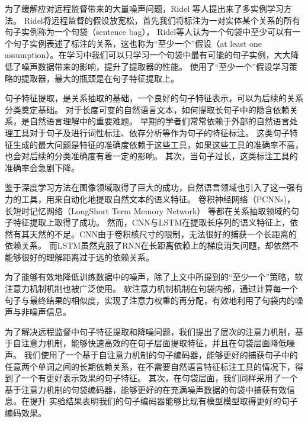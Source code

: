 \documentclass[UTF8]{csoarticle}
\begin{document}
为了缓解应对远程监督带来的大量噪声问题，Ridel\cite{bib1} 等人提出来了多实例学习方法。
Ridel将远程监督的假设放宽松，首先我们将标注为一对实体某个关系的所有句子实例称为一个句袋（sentence bag），
Ridel等人认为一个句袋中至少可以有一个句子实例表述了标注的关系，这也称为“至少一个”假设（at least one assumption）。在学习中我们可以只学习一个句袋中最有可能的句子实例，大大降低了噪声数据带来的影响，提升了提取器的性能。
使用了“至少一个”假设学习策略的提取器，最大的瓶颈是在句子特征提取上。

句子特征提取，是关系抽取的基础，一个良好的句子特征表示，可以为后续的关系分类奠定基础。
对于长度可变的自然语言文本，如何提取长句子中的隐含依赖关系，是自然语言理解中的重要难题。
早期的学者们常常依赖于外部的自然语言处理工具对于句子及进行词性标注、依存分析等作为句子的特征标注。
这类句子特征生成的最大问题是特征的准确度依赖于这些工具，如果这些工具的准确率不高，也会对后续的分类准确度有着一定的影响。
其次，当句子过长，这类标注工具的准确率会急剧下降。

鉴于深度学习方法在图像领域取得了巨大的成功，自然语言领域也引入了这一强有力的工具，用来自动化地提取自然文本的语义特征。
卷积神经网络（PCNNs)\cite{bib11}，长短时记忆网络（LongShort Term Memory Network）\cite{bib10} 等都在关系抽取领域的句子特征提取上取得了成功。
然而，CNN与LSTM在提取长序列的语义特征上，依然有其天然的不足。CNN由于卷积核尺寸的限制，无法很好的捕获一个长距离的依赖关系。
而LSTM虽然克服了RNN在长距离依赖上的梯度消失问题，却依然不能够很好的理解距离过于远的依赖关系。

为了能够有效地降低训练数据中的噪声，除了上文中所提到的“至少一个”策略，软注意力机制机制也被广泛使用。
软注意力机制机制在句袋内部，通过计算每一个句子与最终结果的相似度，实现了注意力权重的再分配，有效地利用了句袋内的噪声与非噪声信息。

为了解决远程监督中句子特征提取和降噪问题，我们提出了层次的注意力机制，基于自注意力机制，能够快速高效的在句子层面提取特征，并且在句袋层面降低噪声。
我们使用了一个基于自注意力机制的句子编码器，能够更好的捕获句子中的任意两个单词之间的长期依赖关系，在不需要自然语言特征标注工具的情况下，得到了一个有更好表示效果的句子特征。
其次，在句袋层面，我们同样采用了一个基于注意力机制的句袋编码器，能够更好的在充满噪声数据的句袋中捕获有效信息。在提升
实验结果表明我们的句子编码器能够比现有模型模型取得更好的句子编码效果。
\end{document}
